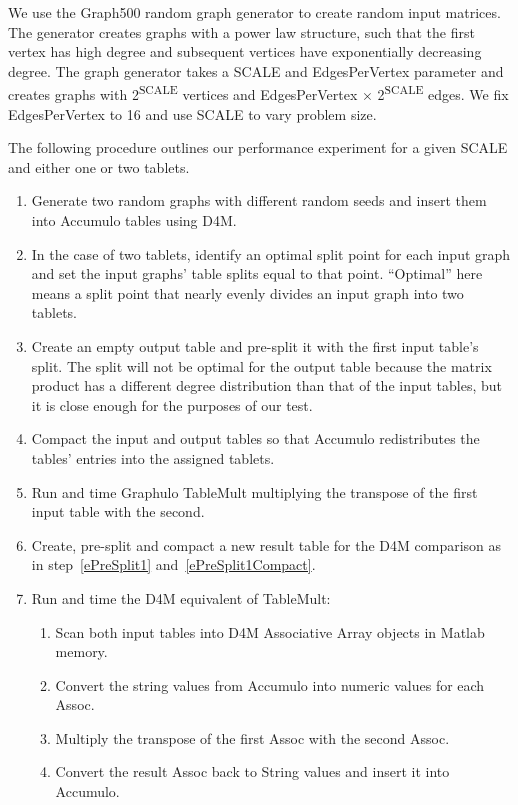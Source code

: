 We use the Graph500 random graph generator \cite{bader2006designing} to create random input matrices.
The generator creates graphs with a power law structure, such that the first vertex has high degree
and subsequent vertices have exponentially decreasing degree.
The graph generator takes a SCALE and EdgesPerVertex parameter and creates graphs with 2\textsuperscript{SCALE} 
vertices and EdgesPerVertex $\times$ 2\textsuperscript{SCALE} edges.
We fix EdgesPerVertex to 16 and use SCALE to vary problem size. 

The following procedure outlines our performance experiment for a given SCALE and either one or two tablets.
\begin{enumerate}
\item Generate two random graphs with different random seeds and insert them into Accumulo tables using D4M.
\item In the case of two tablets, identify an optimal split point for each input graph
and set the input graphs' table splits equal to that point.
``Optimal'' here means a split point that nearly evenly divides an input graph into two tablets.
\item \label{ePreSplit1} Create an empty output table and pre-split it with the first input table's split.
The split will not be optimal for the output table because the matrix product has a different degree distribution 
than that of the input tables, but it is close enough for the purposes of our test.
\item \label{ePreSplit1Compact} Compact the input and output tables 
so that Accumulo redistributes the tables' entries into the assigned tablets.
\item Run and time Graphulo TableMult multiplying the transpose of the first input table with the second.
\item Create, pre-split and compact a new result table for the D4M comparison 
as in step~\ref{ePreSplit1} and~\ref{ePreSplit1Compact}.
\item Run and time the D4M equivalent of TableMult:
 \begin{enumerate}
 \item Scan both input tables into D4M Associative Array objects in Matlab memory.
 \item Convert the string values from Accumulo into numeric values for each Assoc.
 \item Multiply the transpose of the first Assoc with the second Assoc.
 \item Convert the result Assoc back to String values and insert it into Accumulo.
 \end{enumerate}
\end{enumerate}

